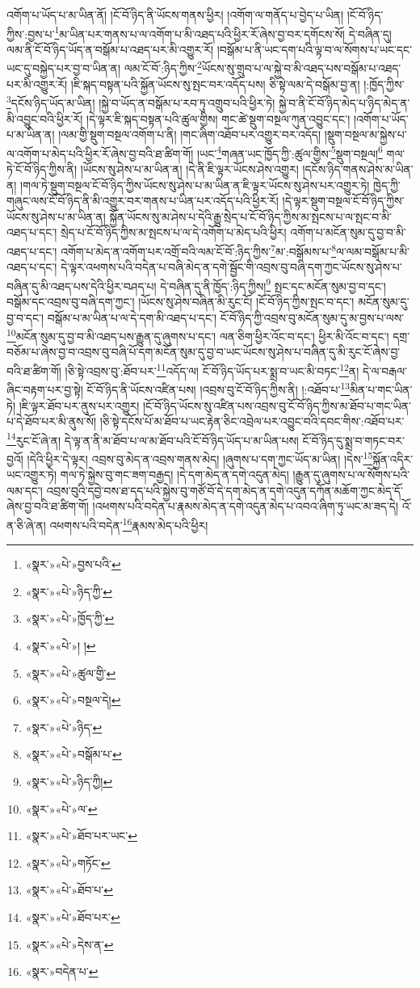 འགོག་པ་ཡོད་པ་མ་ཡིན་ནོ། །ངོ་བོ་ཉིད་ནི་ཡོངས་གནས་ཕྱིར། །འགོག་ལ་གནོད་པ་བྱེད་པ་ཡིན། །ངོ་བོ་ཉིད་ཀྱིས་:བྱས་པ་\footnote{«སྣར་»«པེ་»བྱས་པའི་}མ་ཡིན་པར་གནས་པ་ལ་འགོག་པ་མི་འཐད་པའི་ཕྱིར་རོ་ཞེས་བྱ་བར་དགོངས་སོ། དེ་བཞིན་དུ། ལམ་ནི་ངོ་བོ་ཉིད་ཡོད་ན་བསྒོམ་པ་འཐད་པར་མི་འགྱུར་རོ། །བསྒོམ་པ་ནི་ཡང་དག་པའི་ལྟ་བ་ལ་སོགས་པ་ཡང་དང་ཡང་དུ་བསྐྱེད་པར་བྱ་བ་ཡིན་ན། ལམ་ངོ་བོ་:ཉིད་ཀྱིས་\footnote{«སྣར་»«པེ་»ཉིད་ཀྱི་}ཡོངས་སུ་གྲུབ་པ་ལ་སྐྱེ་བ་མི་འཐད་པས་བསྒོམ་པ་འཐད་པར་མི་འགྱུར་རོ། །ཇི་སྐད་བསྟན་པའི་སྐྱོན་ཡོངས་སུ་སྤང་བར་འདོད་པས། ཅི་སྟེ་ལམ་དེ་བསྒོམ་བྱ་ན། །:ཁྱོད་ཀྱིས་\footnote{«སྣར་»«པེ་»ཁྱོད་ཀྱི་}དངོས་ཉིད་ཡོད་མ་ཡིན། །སྐྱེ་བ་ཡོད་ན་བསྒོམ་པ་རབ་ཏུ་འགྲུབ་པའི་ཕྱིར་ཏེ། སྐྱེ་བ་ནི་ངོ་བོ་ཉིད་མེད་པ་ཉིད་མེད་ན་མི་འབྱུང་བའི་ཕྱིར་རོ། །དེ་ལྟར་ཇི་སྐད་བསྟན་པའི་ཚུལ་གྱིས། གང་ཚེ་སྡུག་བསྔལ་ཀུན་འབྱུང་དང་། །འགོག་པ་ཡོད་པ་མ་ཡིན་ན། །ལམ་གྱི་སྡུག་བསྔལ་འགོག་པ་ནི། །གང་ཞིག་འཐོབ་པར་འགྱུར་བར་འདོད། །སྡུག་བསྔལ་མ་སྐྱེས་པ་ལ་འགོག་པ་མེད་པའི་ཕྱིར་རོ་ཞེས་བྱ་བའི་ཐ་ཚིག་གོ། །ཡང་\footnote{«སྣར་»«པེ་»། །}གཞན་ཡང་ཁྱོད་ཀྱི་:ཚུལ་གྱིས་\footnote{«སྣར་»«པེ་»ཚུལ་གྱི་}སྡུག་བསྔལ།\footnote{«སྣར་»«པེ་»བསྔལ་དེ།} གལ་ཏེ་ངོ་བོ་ཉིད་ཀྱིས་ནི། །ཡོངས་སུ་ཤེས་པ་མ་ཡིན་ན། །དེ་ནི་ཇི་ལྟར་ཡོངས་ཤེས་འགྱུར། །དངོས་ཉིད་གནས་ཤེས་མ་ཡིན་ན། །གལ་ཏེ་སྡུག་བསྔལ་ངོ་བོ་ཉིད་ཀྱིས་ཡོངས་སུ་ཤེས་པ་མ་ཡིན་ན་ཇི་ལྟར་ཡོངས་སུ་ཤེས་པར་འགྱུར་ཏེ། ཁྱེད་ཀྱི་གཞུང་ལས་ངོ་བོ་ཉིད་ནི་མི་འགྱུར་བར་གནས་པ་ཡིན་པར་འདོད་པའི་ཕྱིར་རོ། །དེ་ལྟར་སྡུག་བསྔལ་ངོ་བོ་ཉིད་ཀྱིས་ཡོངས་སུ་ཤེས་པ་མ་ཡིན་ན། སྐྱོན་ཡོངས་སུ་མ་ཤེས་པ་དེའི་རྒྱུ་སྲེད་པ་ངོ་བོ་ཉིད་ཀྱིས་མ་སྤངས་པ་ལ་སྤང་བ་མི་འཐད་པ་དང་། སྲེད་པ་ངོ་བོ་ཉིད་ཀྱིས་མ་སྤངས་པ་ལ་དེ་འགོག་པ་མེད་པའི་ཕྱིར། འགོག་པ་མངོན་སུམ་དུ་བྱ་བ་མི་འཐད་པ་དང་། འགོག་པ་མེད་ན་འགོག་པར་འགྲོ་བའི་ལམ་ངོ་བོ་:ཉིད་ཀྱིས་\footnote{«སྣར་»«པེ་»ཉིད་}མ་:བསྒོམས་པ་\footnote{«སྣར་»«པེ་»བསྒོམ་པ་}ལ་ལམ་བསྒོམ་པ་མི་འཐད་པ་དང་། དེ་ལྟར་འཕགས་པའི་བདེན་པ་བཞི་མེད་ན་དགེ་སྦྱོང་གི་འབྲས་བུ་བཞི་དག་ཀྱང་ཡོངས་སུ་ཤེས་པ་བཞིན་དུ་མི་འཐད་པས་དེའི་ཕྱིར་བཤད་པ། དེ་བཞིན་དུ་ནི་ཁྱོད་:ཉིད་ཀྱིས།\footnote{«སྣར་»«པེ་»ཉིད་ཀྱི།} སྤང་དང་མངོན་སུམ་བྱ་བ་དང་། བསྒོམ་དང་འབྲས་བུ་བཞི་དག་ཀྱང་། །ཡོངས་སུ་ཤེས་བཞིན་མི་རུང་ངོ། །ངོ་བོ་ཉིད་ཀྱིས་སྤང་བ་དང་། མངོན་སུམ་དུ་བྱ་བ་དང་། བསྒོམ་པ་མ་ཡིན་པ་ལ་དེ་དག་མི་འཐད་པ་དང་། ངོ་བོ་ཉིད་ཀྱི་འབྲས་བུ་མངོན་སུམ་དུ་མ་བྱས་པ་ལས་\footnote{«སྣར་»«པེ་»ལ་}མངོན་སུམ་དུ་བྱ་བ་མི་འཐད་པས་རྒྱུན་དུ་ཞུགས་པ་དང་། ལན་ཅིག་ཕྱིར་འོང་བ་དང་། ཕྱིར་མི་འོང་བ་དང་། དགྲ་བཅོམ་པ་ཞེས་བྱ་བ་འབྲས་བུ་བཞི་པོ་དག་མངོན་སུམ་དུ་བྱ་བ་ཡང་ཡོངས་སུ་ཤེས་པ་བཞིན་དུ་མི་རུང་ངོ་ཞེས་བྱ་བའི་ཐ་ཚིག་གོ། །ཅི་སྟེ་འབྲས་བུ་:ཐོབ་པར་\footnote{«སྣར་»«པེ་»ཐོབ་པར་ཡང་}འདོད་ལ། ངོ་བོ་ཉིད་ཡོད་པར་སྨྲ་བ་ཡང་མི་བཏང་\footnote{«སྣར་»«པེ་»གཏོང་}ན། དེ་ལ་བརྒལ་ཞིང་བརྟག་པར་བྱ་སྟེ། ངོ་བོ་ཉིད་ནི་ཡོངས་འཛིན་པས། །འབྲས་བུ་ངོ་བོ་ཉིད་ཀྱིས་ནི། །:འཐོབ་པ་\footnote{«སྣར་»«པེ་»ཐོབ་པ་}མིན་པ་གང་ཡིན་ཏེ། །ཇི་ལྟར་ཐོབ་པར་ནུས་པར་འགྱུར། །ངོ་བོ་ཉིད་ཡོངས་སུ་འཛིན་པས་འབྲས་བུ་ངོ་བོ་ཉིད་ཀྱིས་མ་ཐོབ་པ་གང་ཡིན་པ་དེ་ཐོབ་པར་མི་ནུས་སོ། །ཅི་སྟེ་དངོས་པོ་མ་ཐོབ་པ་ཡང་རྟེན་ཅིང་འབྲེལ་པར་འབྱུང་བའི་དབང་གིས་:འཐོབ་པར་\footnote{«སྣར་»«པེ་»ཐོབ་པར་}རུང་ངོ་ཞེ་ན། དེ་ལྟ་ན་ནི་མ་ཐོབ་པ་ལ་མ་ཐོབ་པའི་ངོ་བོ་ཉིད་ཡོད་པ་མ་ཡིན་པས། ངོ་བོ་ཉིད་དུ་སྨྲ་བ་གཏང་བར་བྱའོ། །དེའི་ཕྱིར་དེ་ལྟར། འབྲས་བུ་མེད་ན་འབྲས་གནས་མེད། །ཞུགས་པ་དག་ཀྱང་ཡོད་མ་ཡིན། །དེས་\footnote{«སྣར་»«པེ་»དེས་ན་}སྐྱོན་འདིར་ཡང་འགྱུར་ཏེ། གལ་ཏེ་སྐྱེས་བུ་གང་ཟག་བརྒྱད། །དེ་དག་མེད་ན་དགེ་འདུན་མེད། །རྒྱུན་དུ་ཞུགས་པ་ལ་སོགས་པའི་ལམ་དང་། འབྲས་བུའི་དབྱེ་བས་ཐ་དད་པའི་སྐྱེས་བུ་གཙོ་བོ་དེ་དག་མེད་ན་དགེ་འདུན་དཀོན་མཆོག་ཀྱང་མེད་དོ་ཞེས་བྱ་བའི་ཐ་ཚིག་གོ། །འཕགས་པའི་བདེན་པ་རྣམས་མེད་ན་དགེ་འདུན་མེད་པ་འབའ་ཞིག་ཏུ་ཡང་མ་ཟད་དེ། འོ་ན་ཅི་ཞེ་ན། འཕགས་པའི་བདེན་\footnote{«སྣར་»བདེན་པ་}རྣམས་མེད་པའི་ཕྱིར། 